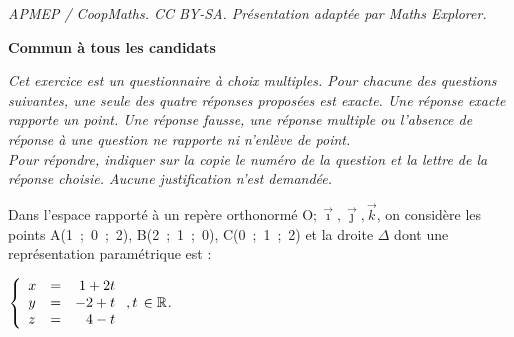 \documentclass[10pt]{article}
\providecommand{\R}{\mathbb{R}}
\providecommand{\Oijk}{\(\mathrm{O};\vec{\imath},\vec{\jmath},\vec{k}\)}
\begin{document}
\noindent\textit{APMEP / CoopMaths. CC BY-SA. Présentation adaptée par Maths Explorer.}\par\medskip
\textbf{Commun à tous les candidats}

\medskip

\emph{Cet exercice est un questionnaire à choix multiples. Pour chacune des questions suivantes, une seule des quatre réponses proposées est exacte. Une réponse exacte rapporte un point. Une réponse fausse, une réponse multiple ou l'absence de réponse à une question ne rapporte ni n'enlève de point.\\[5pt]
 Pour répondre, indiquer sur la copie le numéro de la question et la lettre de la réponse choisie. Aucune justification n'est demandée.}

\medskip

Dans l'espace rapporté à un repère orthonormé \Oijk, on considère les points A(1~;~0~;~2), B(2~;~1~;~0), C(0~;~1~;~2) et la droite $\Delta$ dont une représentation paramétrique est :

$\left\{\begin{array}{l c r}
x &=& 1 + 2t\\
y &=& -2 + t\\ 
z&=&4 - t
\end{array}\right., t\, \in \R$.

\medskip
\end{document}
